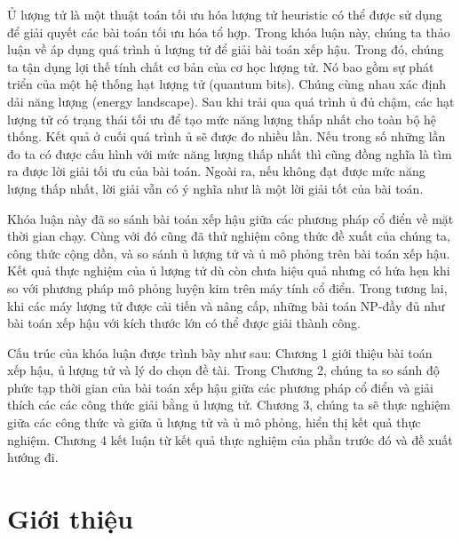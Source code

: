 \documentclass[13pt, a4paper]{report}
\begin{document}
Ủ lượng tử là một thuật toán tối ưu hóa lượng tử heuristic có thể được sử dụng để giải quyết các bài toán tối ưu hóa tổ hợp. Trong khóa luận này, chúng ta thảo luận về áp dụng quá trình ủ lượng tử để giải bài toán xếp hậu. Trong đó, chúng ta tận dụng lợi thế tính chất cơ bản của cơ học lượng tử. Nó bao gồm sự phát triển của một hệ thống hạt lượng tử (quantum bits). Chúng cùng nhau xác định dải năng lượng (energy landscape). Sau khi trải qua quá trình ủ đủ chậm, các hạt lượng tử có trạng thái tối ưu để tạo mức năng lượng thấp nhất cho toàn bộ hệ thống. Kết quả ở cuối quá trình ủ sẽ được đo nhiều lần. Nếu trong số những lần đo ta có được cấu hình với mức năng lượng thấp nhất thì cũng đồng nghĩa là tìm ra được lời giải tối ưu của bài toán. Ngoài ra, nếu không đạt được mức năng lượng thấp nhất, lời giải vẫn có ý nghĩa như là một lời giải tốt của bài toán.

Khóa luận này đã so sánh bài toán xếp hậu giữa các phương pháp cổ điển về mặt thời gian chạy. Cùng với đó cũng đã thử nghiệm công thức đề xuất của chúng ta, công thức cộng dồn, và so sánh ủ lượng tử và ủ mô phỏng trên bài toán xếp hậu. Kết quả thực nghiệm của ủ lượng tử dù còn chưa hiệu quả nhưng có hứa hẹn khi so với phương pháp mô phỏng luyện kim trên máy tính cổ điển. Trong tương lai, khi các máy lượng tử được cải tiến và nâng cấp, những bài toán NP-đầy đủ như bài toán xếp hậu với kích thước lớn có thể được giải thành công. 

Cấu trúc của khóa luận được trình bày như sau: Chương 1 giới thiệu bài toán xếp hậu, ủ lượng tử và lý do chọn đề tài. Trong Chương 2, chúng ta so sánh độ phức tạp thời gian của bài toán xếp hậu giữa các phương pháp cổ điển và giải thích các các công thức giải bằng ủ lượng tử. Chương 3, chúng ta sẽ thực nghiệm giữa các công thức và giữa ủ lượng tử và ủ mô phỏng, hiển thị kết quả thực nghiệm. Chương 4 kết luận từ kết quả thực nghiệm của phần trước đó và đề xuất hướng đi.
\newline
\newline
{}

\onecolumn
\thispagestyle{empty}
\tableofcontents
\thispagestyle{empty}
\clearpage



\chapter{Giới thiệu} 






\onecolumn

\newpage


\end{document}
